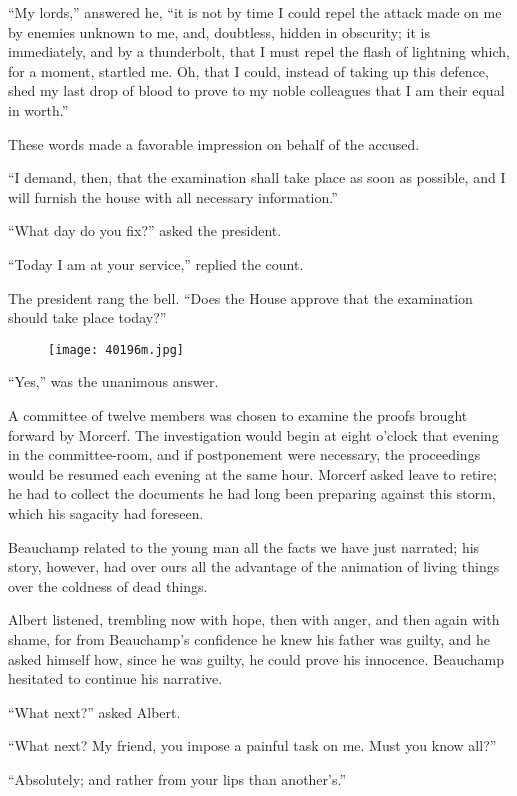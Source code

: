 “My lords,” answered he, “it is not by time I could repel the attack
made on me by enemies unknown to me, and, doubtless, hidden in
obscurity; it is immediately, and by a thunderbolt, that I must repel
the flash of lightning which, for a moment, startled me. Oh, that I
could, instead of taking up this defence, shed my last drop of blood to
prove to my noble colleagues that I am their equal in worth.”

These words made a favorable impression on behalf of the accused.

“I demand, then, that the examination shall take place as soon as
possible, and I will furnish the house with all necessary information.”

“What day do you fix?” asked the president.

“Today I am at your service,” replied the count.

The president rang the bell. “Does the House approve that the
examination should take place today?”

\begin{figure}[ht]
\texttt{[image: 40196m.jpg]}
\end{figure}

“Yes,” was the unanimous answer.

A committee of twelve members was chosen to examine the proofs brought
forward by Morcerf. The investigation would begin at eight o’clock that
evening in the committee-room, and if postponement were necessary, the
proceedings would be resumed each evening at the same hour. Morcerf
asked leave to retire; he had to collect the documents he had long been
preparing against this storm, which his sagacity had foreseen.

Beauchamp related to the young man all the facts we have just narrated;
his story, however, had over ours all the advantage of the animation of
living things over the coldness of dead things.

Albert listened, trembling now with hope, then with anger, and then
again with shame, for from Beauchamp’s confidence he knew his father
was guilty, and he asked himself how, since he was guilty, he could
prove his innocence. Beauchamp hesitated to continue his narrative.

“What next?” asked Albert.

“What next? My friend, you impose a painful task on me. Must you know
all?”

“Absolutely; and rather from your lips than another’s.”

